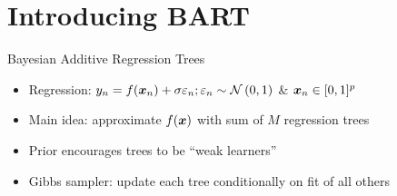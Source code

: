 \documentclass[aspectratio=199]{beamer}
\begin{document}
\section{Introducing BART}
\begin{frame}[noframenumbering]
\tableofcontents[currentsection]
\end{frame}

\begin{frame}{Bayesian Additive Regression Trees}
\begin{itemize}
\item{Regression: $y_{n} = f(\bm{x}_{n}) + \sigma \varepsilon_{n}; \varepsilon_{n} \sim \mathcal{N}\left(0,1\right)$ \& $\bm{x}_{n} \in [0,1]^{p}$}
\item{Main idea: approximate $f(\bm{x})$ with sum of $M$ regression trees} 
\item{Prior encourages trees to be ``weak learners''}
\item{Gibbs sampler: update each tree conditionally on fit of all others}

\end{itemize}

\begin{columns}


\end{columns}
\end{frame}
\end{document}
